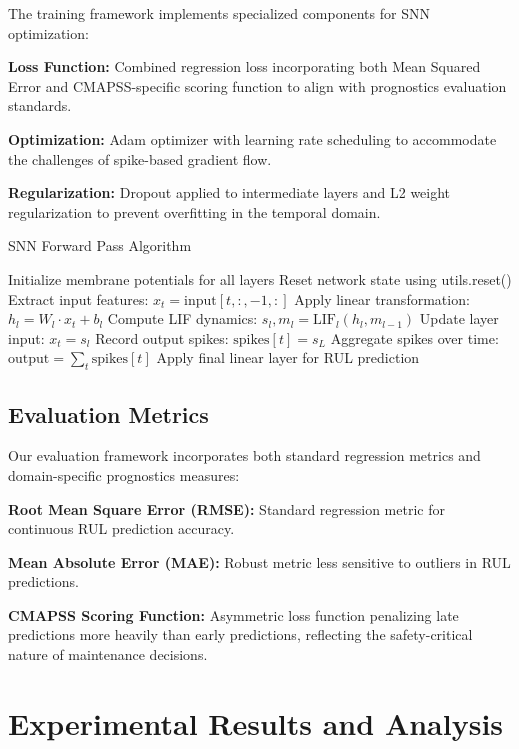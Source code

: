 \documentclass[11pt]{article}
\begin{document}
The training framework implements specialized components for SNN optimization:

\textbf{Loss Function:} Combined regression loss incorporating both Mean Squared Error and CMAPSS-specific scoring function to align with prognostics evaluation standards.

\textbf{Optimization:} Adam optimizer with learning rate scheduling to accommodate the challenges of spike-based gradient flow.

\textbf{Regularization:} Dropout applied to intermediate layers and L2 weight regularization to prevent overfitting in the temporal domain.

\begin{algorithm}
\caption{SNN Forward Pass Algorithm}
\begin{algorithmic}
\STATE Initialize membrane potentials for all layers
\STATE Reset network state using utils.reset()
    \STATE Extract input features: $x_t = \text{input}[t, :, -1, :]$
        \STATE Apply linear transformation: $h_l = W_l \cdot x_t + b_l$
        \STATE Compute LIF dynamics: $s_l, m_l = \text{LIF}_l(h_l, m_{l-1})$
        \STATE Update layer input: $x_t = s_l$
    \ENDFOR
    \STATE Record output spikes: $\text{spikes}[t] = s_L$
\ENDFOR
\STATE Aggregate spikes over time: $\text{output} = \sum_t \text{spikes}[t]$
\STATE Apply final linear layer for RUL prediction
\end{algorithmic}
\end{algorithm}

\subsection{Evaluation Metrics}

Our evaluation framework incorporates both standard regression metrics and domain-specific prognostics measures:

\textbf{Root Mean Square Error (RMSE):} Standard regression metric for continuous RUL prediction accuracy.

\textbf{Mean Absolute Error (MAE):} Robust metric less sensitive to outliers in RUL predictions.

\textbf{CMAPSS Scoring Function:} Asymmetric loss function penalizing late predictions more heavily than early predictions, reflecting the safety-critical nature of maintenance decisions.

\section{Experimental Results and Analysis}
\end{document}
